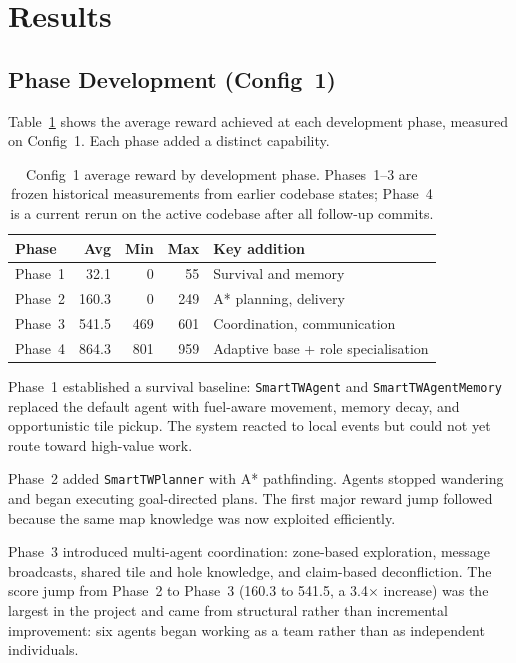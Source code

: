 \documentclass[letterpaper]{article}
\begin{document}
\section{Results}

\subsection{Phase Development (Config~1)}

Table~\ref{tab:phases} shows the average reward achieved at each development
phase, measured on Config~1. Each phase added a distinct capability.

\begin{table}[h]
\centering
\small
\begin{tabular}{@{}lrrrp{3.2cm}@{}}
\toprule
\textbf{Phase} & \textbf{Avg} & \textbf{Min} & \textbf{Max} & \textbf{Key addition} \\
\midrule
Phase~1 & 32.1  & 0   & 55  & Survival and memory \\
Phase~2 & 160.3 & 0   & 249 & A* planning, delivery \\
Phase~3 & 541.5 & 469 & 601 & Coordination, communication \\
Phase~4 & 864.3 & 801 & 959 & Adaptive base + role specialisation \\
\bottomrule
\end{tabular}
\caption{Config~1 average reward by development phase. Phases~1--3 are frozen
historical measurements from earlier codebase states; Phase~4 is a current
rerun on the active codebase after all follow-up commits.}
\label{tab:phases}
\end{table}

Phase~1 established a survival baseline: \texttt{SmartTWAgent} and
\texttt{SmartTWAgentMemory} replaced the default agent with fuel-aware movement,
memory decay, and opportunistic tile pickup. The system reacted to local events
but could not yet route toward high-value work.

Phase~2 added \texttt{SmartTWPlanner} with A* pathfinding. Agents stopped
wandering and began executing goal-directed plans. The first major reward jump
followed because the same map knowledge was now exploited efficiently.

Phase~3 introduced multi-agent coordination: zone-based exploration,
message broadcasts, shared tile and hole knowledge, and claim-based
deconfliction. The score jump from Phase~2 to Phase~3 (160.3 to 541.5, a 3.4$\times$
increase) was the largest in the project and came from structural rather than
incremental improvement: six agents began working as a team rather than as
independent individuals.
\end{document}
